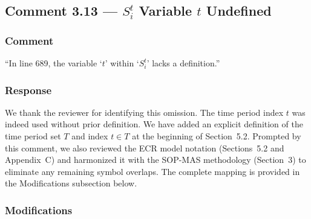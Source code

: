 \documentclass[11pt,a4paper]{article}
\begin{document}
\subsection{Comment 3.13 --- $S_i^t$ Variable $t$ Undefined}

\subsubsection{Comment}
``In line 689, the variable `$t$' within `$S_i^t$' lacks a definition.''

\subsubsection{Response}
We thank the reviewer for identifying this omission. The time period index $t$ was indeed used without prior definition. We have added an explicit definition of the time period set $T$ and index $t \in T$ at the beginning of Section~5.2. Prompted by this comment, we also reviewed the ECR model notation (Sections~5.2 and Appendix~C) and harmonized it with the SOP-MAS methodology (Section~3) to eliminate any remaining symbol overlaps. The complete mapping is provided in the Modifications subsection below.

\subsubsection{Modifications}
\end{document}
